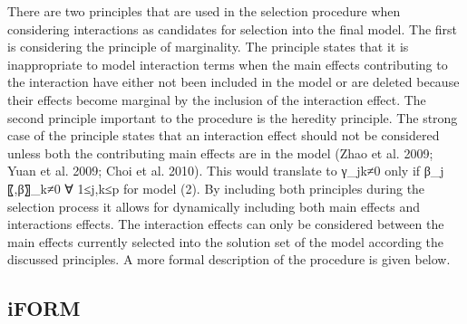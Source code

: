 \documentclass[]{book}
\theoremstyle{definition}
\theoremstyle{definition}
\theoremstyle{remark}
\begin{document}
There are two principles that are used in the selection procedure when
considering interactions as candidates for selection into the final
model. The first is considering the principle of marginality. The
principle states that it is inappropriate to model interaction terms
when the main effects contributing to the interaction have either not
been included in the model or are deleted because their effects become
marginal by the inclusion of the interaction effect. The second
principle important to the procedure is the heredity principle. The
strong case of the principle states that an interaction effect should
not be considered unless both the contributing main effects are in the
model (Zhao et al. 2009; Yuan et al. 2009; Choi et al. 2010). This would
translate to γ\_jk≠0 only if β\_j 〖,β〗\_k≠0 ∀ 1≤j,k≤p for model (2).
By including both principles during the selection process it allows for
dynamically including both main effects and interactions effects. The
interaction effects can only be considered between the main effects
currently selected into the solution set of the model according the
discussed principles. A more formal description of the procedure is
given below.

\subsection{iFORM}\label{iform}
\end{document}
